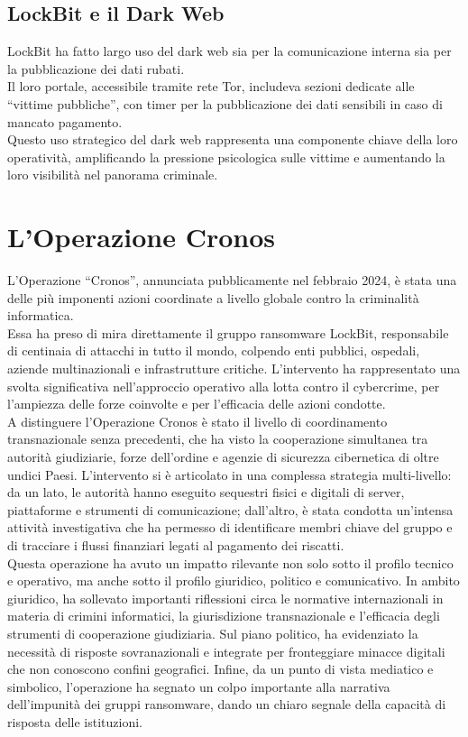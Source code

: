 \documentclass[a4paper,12pt]{article}
\begin{document}
\subsection{LockBit e il Dark Web}
LockBit ha fatto largo uso del dark web sia per la comunicazione interna sia per la pubblicazione dei dati rubati. \\
Il loro portale, accessibile tramite rete Tor, includeva sezioni dedicate alle “vittime pubbliche”, con timer per la pubblicazione dei dati sensibili in caso di mancato pagamento.\\
Questo uso strategico del dark web rappresenta una componente chiave della loro operatività, amplificando la pressione psicologica sulle vittime e aumentando la loro visibilità nel panorama criminale.

\section{L'Operazione Cronos}
L’Operazione “Cronos”, annunciata pubblicamente nel febbraio 2024, è stata una delle più imponenti azioni coordinate a livello globale contro la criminalità informatica.\\
Essa ha preso di mira direttamente il gruppo ransomware LockBit, responsabile di centinaia di attacchi in tutto il mondo, colpendo enti pubblici, ospedali, aziende multinazionali e infrastrutture critiche. L'intervento ha rappresentato una svolta significativa nell’approccio operativo alla lotta contro il cybercrime, per l’ampiezza delle forze coinvolte e per l’efficacia delle azioni condotte.\\
A distinguere l’Operazione Cronos è stato il livello di coordinamento transnazionale senza precedenti, che ha visto la cooperazione simultanea tra autorità giudiziarie, forze dell’ordine e agenzie di sicurezza cibernetica di oltre undici Paesi. L’intervento si è articolato in una complessa strategia multi-livello: da un lato, le autorità hanno eseguito sequestri fisici e digitali di server, piattaforme e strumenti di comunicazione; dall’altro, è stata condotta un’intensa attività investigativa che ha permesso di identificare membri chiave del gruppo e di tracciare i flussi finanziari legati al pagamento dei riscatti.\\
Questa operazione ha avuto un impatto rilevante non solo sotto il profilo tecnico e operativo, ma anche sotto il profilo giuridico, politico e comunicativo. In ambito giuridico, ha sollevato importanti riflessioni circa le normative internazionali in materia di crimini informatici, la giurisdizione transnazionale e l’efficacia degli strumenti di cooperazione giudiziaria. Sul piano politico, ha evidenziato la necessità di risposte sovranazionali e integrate per fronteggiare minacce digitali che non conoscono confini geografici. Infine, da un punto di vista mediatico e simbolico, l’operazione ha segnato un colpo importante alla narrativa dell’impunità dei gruppi ransomware, dando un chiaro segnale della capacità di risposta delle istituzioni.
\end{document}

